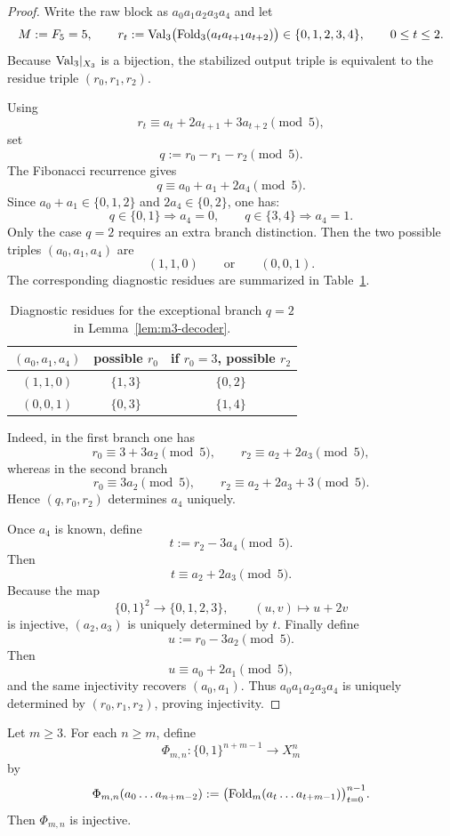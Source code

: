 \begin{proof}
Write the raw block as $a_0a_1a_2a_3a_4$ and let
\[
M:=F_5=5,
\qquad
r_t:=\mathrm{Val}_3\bigl(\mathrm{Fold}_3(a_ta_{t+1}a_{t+2})\bigr)\in\{0,1,2,3,4\},
\qquad 0\le t\le 2.
\]
Because $\mathrm{Val}_3|_{X_3}$ is a bijection, the stabilized output triple is equivalent to the residue triple $(r_0,r_1,r_2)$.

Using
\[
r_t\equiv a_t+2a_{t+1}+3a_{t+2}\pmod 5,
\]
set
\[
q:=r_0-r_1-r_2\pmod 5.
\]
The Fibonacci recurrence gives
\[
q\equiv a_0+a_1+2a_4\pmod 5.
\]
Since $a_0+a_1\in\{0,1,2\}$ and $2a_4\in\{0,2\}$, one has:
\[
q\in\{0,1\}\Longrightarrow a_4=0,
\qquad
q\in\{3,4\}\Longrightarrow a_4=1.
\]
Only the case $q=2$ requires an extra branch distinction. Then the two possible triples $(a_0,a_1,a_4)$ are
\[
(1,1,0)\qquad\text{or}\qquad (0,0,1).
\]
The corresponding diagnostic residues are summarized in Table~\ref{tab:m3-decoder}.

\begin{table}[t]
\centering
\caption{Diagnostic residues for the exceptional branch $q=2$ in Lemma~\ref{lem:m3-decoder}.}
\label{tab:m3-decoder}
\begin{tabular}{ccc}
\toprule
$(a_0,a_1,a_4)$ & possible $r_0$ & if $r_0=3$, possible $r_2$ \\
\midrule
$(1,1,0)$ & $\{1,3\}$ & $\{0,2\}$ \\
$(0,0,1)$ & $\{0,3\}$ & $\{1,4\}$ \\
\bottomrule
\end{tabular}
\end{table}

Indeed, in the first branch one has
\[
r_0\equiv 3+3a_2\pmod 5,
\qquad
r_2\equiv a_2+2a_3\pmod 5,
\]
whereas in the second branch
\[
r_0\equiv 3a_2\pmod 5,
\qquad
r_2\equiv a_2+2a_3+3\pmod 5.
\]
Hence $(q,r_0,r_2)$ determines $a_4$ uniquely.

Once $a_4$ is known, define
\[
t:=r_2-3a_4\pmod 5.
\]
Then
\[
t\equiv a_2+2a_3\pmod 5.
\]
Because the map
\[
\{0,1\}^2\to\{0,1,2,3\},\qquad (u,v)\mapsto u+2v
\]
is injective, $(a_2,a_3)$ is uniquely determined by $t$. Finally define
\[
u:=r_0-3a_2\pmod 5.
\]
Then
\[
u\equiv a_0+2a_1\pmod 5,
\]
and the same injectivity recovers $(a_0,a_1)$. Thus $a_0a_1a_2a_3a_4$ is uniquely determined by $(r_0,r_1,r_2)$, proving injectivity.
\end{proof}

\begin{theorem}\label{thm:block-invertibility}
Let $m\ge 3$. For each $n\ge m$, define
\[
\Phi_{m,n}:\{0,1\}^{n+m-1}\longrightarrow X_m^n
\]
by
\[
\Phi_{m,n}(a_0\ldots a_{n+m-2})
:=
\bigl(\mathrm{Fold}_m(a_t\ldots a_{t+m-1})\bigr)_{t=0}^{n-1}.
\]
Then $\Phi_{m,n}$ is injective.
\end{theorem}

